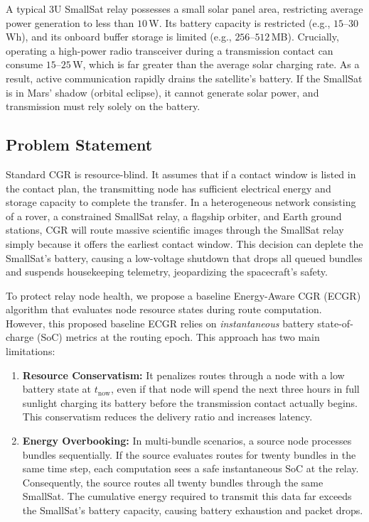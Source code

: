 \documentclass[a4paper,fleqn]{cas-dc}
\newcommand{\ecgr}{\textsf{ECGR}}
\begin{document}
A typical 3U SmallSat relay possesses a small solar panel area, restricting average power generation to less than $10\,$W. Its battery capacity is restricted (e.g., $15$--$30\,$Wh), and its onboard buffer storage is limited (e.g., $256$--$512\,$MB). Crucially, operating a high-power radio transceiver during a transmission contact can consume $15$--$25\,$W, which is far greater than the average solar charging rate. As a result, active communication rapidly drains the satellite's battery. If the SmallSat is in Mars' shadow (orbital eclipse), it cannot generate solar power, and transmission must rely solely on the battery.

\subsection{Problem Statement}
Standard CGR is resource-blind. It assumes that if a contact window is listed in the contact plan, the transmitting node has sufficient electrical energy and storage capacity to complete the transfer. In a heterogeneous network consisting of a rover, a constrained SmallSat relay, a flagship orbiter, and Earth ground stations, CGR will route massive scientific images through the SmallSat relay simply because it offers the earliest contact window. This decision can deplete the SmallSat's battery, causing a low-voltage shutdown that drops all queued bundles and suspends housekeeping telemetry, jeopardizing the spacecraft's safety.

To protect relay node health, we propose a baseline Energy-Aware CGR (\ecgr{}) algorithm that evaluates node resource states during route computation. However, this proposed baseline \ecgr{} relies on \emph{instantaneous} battery state-of-charge (SoC) metrics at the routing epoch. This approach has two main limitations:
\begin{enumerate}
    \item \textbf{Resource Conservatism:} It penalizes routes through a node with a low battery state at $t_{\text{now}}$, even if that node will spend the next three hours in full sunlight charging its battery before the transmission contact actually begins. This conservatism reduces the delivery ratio and increases latency.
    \item \textbf{Energy Overbooking:} In multi-bundle scenarios, a source node processes bundles sequentially. If the source evaluates routes for twenty bundles in the same time step, each computation sees a safe instantaneous SoC at the relay. Consequently, the source routes all twenty bundles through the same SmallSat. The cumulative energy required to transmit this data far exceeds the SmallSat's battery capacity, causing battery exhaustion and packet drops.
\end{enumerate}
\end{document}
